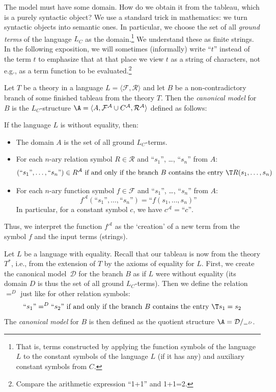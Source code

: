 The model must have some domain. How do we obtain it from the tableau, which is a purely syntactic object? We use a standard trick in mathematics: we turn syntactic objects into semantic ones. In particular, we choose the set of all \emph{ground terms} of the language $L_C$ as the domain.\footnote{That is, terms constructed by applying the function symbols of the language $L$ to the constant symbols of the language $L$ (if it has any) and auxiliary constant symbols from $C$.} We understand these as finite strings. In the following exposition, we will sometimes (informally) write ``$t$'' instead of the term $t$ to emphasize that at that place we view $t$ as a string of characters, not e.g., as a term function to be evaluated.\footnote{Compare the arithmetic expression ``1+1'' and 1+1=2.}

\begin{definition}\label{definition:canonical-model-predicate}
Let $T$ be a theory in a language $L=\langle\mathcal F,\mathcal R\rangle$ and let $B$ be a non-contradictory branch of some finished tableau from the theory $T$. Then the \emph{canonical model} for $B$ is the $L_C$-structure $\A=\langle A,\mathcal F^\mathcal A\cup C^\mathcal A,\mathcal R^\mathcal A\rangle$ defined as follows:

If the language $L$ is without equality, then:
\begin{itemize}
    \item The domain $A$ is the set of all ground $L_C$-terms.
    \item For each $n$-ary relation symbol $R\in\mathcal R$ and ``$s_1$'', \dots, ``$s_n$'' from $A$:
    $$
    (\text{``$s_1$''},\dots,\text{``$s_n$''})\in R^\mathcal A\text{ if and only if the branch $B$ contains the entry $\T R(s_1,\dots,s_n)$}
    $$
    \item For each $n$-ary function symbol $f\in\mathcal F$ and ``$s_1$'', \dots, ``$s_n$'' from $A$:
    $$
    f^\mathcal A(\text{``$s_1$''},\dots,\text{``$s_n$''})=\text{``$f(s_1,\dots,s_n)$''}
    $$
    In particular, for a constant symbol $c$, we have $c^\mathcal A=\text{``$c$''}$.
\end{itemize}
Thus, we interpret the function $f^\mathcal A$ as the `creation' of a new term from the symbol $f$ and the input terms (strings). 

Let $L$ be a language with equality. Recall that our tableau is now from the theory $T^*$, i.e., from the extension of $T$ by the axioms of equality for $L$. First, we create the canonical model~$\mathcal D$ for the branch $B$ as if $L$ were without equality (its domain $D$ is thus the set of all ground $L_C$-terms). Then we define the relation $=^D$ just like for other relation symbols:
$$
\text{``$s_1$''}=^D\text{``$s_2$''}\text{ if and only if the branch $B$ contains the entry $\T s_1=s_2$}
$$
The \emph{canonical model} for $B$ is then defined as the quotient structure $\A=\mathcal{D}/_{=^D}$.
\end{definition}

